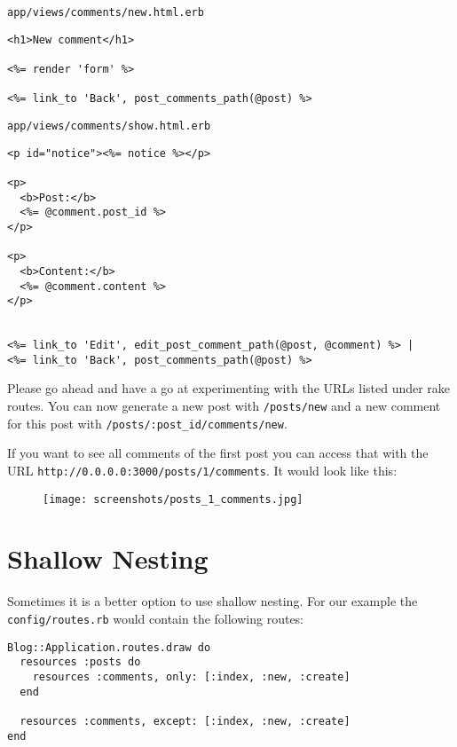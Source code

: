 \documentclass[a4paper]{book}
\newcommand{\chap}[1]{\newpage\thispagestyle{empty}\chapter{#1}\label{chap:\thechapter}}
\begin{document}
\texttt{app/views/comments/new.html.erb}

\begin{shaded}\begin{verbatim}
<h1>New comment</h1>

<%= render 'form' %>

<%= link_to 'Back', post_comments_path(@post) %>
\end{verbatim}\end{shaded}

\texttt{app/views/comments/show.html.erb}

\begin{shaded}\begin{verbatim}
<p id="notice"><%= notice %></p>

<p>
  <b>Post:</b>
  <%= @comment.post_id %>
</p>

<p>
  <b>Content:</b>
  <%= @comment.content %>
</p>


<%= link_to 'Edit', edit_post_comment_path(@post, @comment) %> |
<%= link_to 'Back', post_comments_path(@post) %>
\end{verbatim}\end{shaded}

Please go ahead and have a go at experimenting with the URLs listed under rake routes. You can now generate a new post with \texttt{/posts/new} and a new comment for this post with \texttt{/posts/:post\_id/comments/new}.

If you want to see all comments of the first post you can access that with the URL \texttt{http://0.0.0.0:3000/posts/1/comments}. It would look like this:

\begin{figure}[htbp]
\centering
\texttt{[image: screenshots/posts\_1\_comments.jpg]}
\end{figure}

\chap{Shallow Nesting}\label{shallow-nesting}

Sometimes it is a better option to use shallow nesting. For our example the \texttt{config/routes.rb} would contain the following routes:

\begin{shaded}\begin{verbatim}
Blog::Application.routes.draw do
  resources :posts do
    resources :comments, only: [:index, :new, :create]
  end

  resources :comments, except: [:index, :new, :create]
end
\end{verbatim}\end{shaded}
\end{document}
